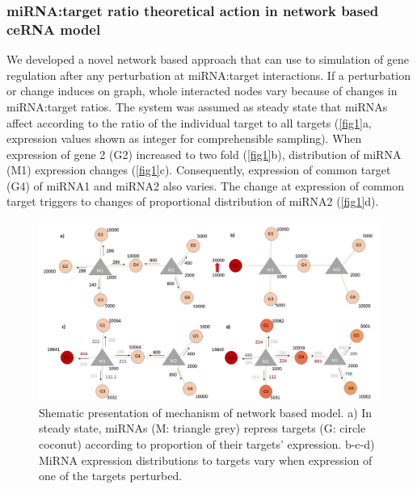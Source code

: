 \documentclass[]{article}
\begin{document}
\hypertarget{mirnatarget-ratio-theoretical-action-in-network-based-cerna-model}{%
\subsubsection{miRNA:target ratio theoretical action in network based
ceRNA
model}\label{mirnatarget-ratio-theoretical-action-in-network-based-cerna-model}}

We developed a novel network based approach that can use to simulation
of gene regulation after any perturbation at miRNA:target interactions.
If a perturbation or change induces on graph, whole interacted nodes
vary because of changes in miRNA:target ratios. The system was assumed
as steady state that miRNAs affect according to the ratio of the
individual target to all targets (\autoref{fig1}a, expression values
shown as integer for comprehensible sampling). When expression of gene 2
(G2) increased to two fold (\autoref{fig1}b), distribution of miRNA (M1)
expression changes (\autoref{fig1}c). Consequently, expression of common
target (G4) of miRNA1 and miRNA2 also varies. The change at expression
of common target triggers to changes of proportional distribution of
miRNA2 (\autoref{fig1}d).

\begin{figure}
\hypertarget{fig1}{%
\centering
\includegraphics{Fig1.jpg}
\caption{Shematic presentation of mechanism of network based model. a)
In steady state, miRNAs (M: triangle grey) repress targets (G: circle
coconut) according to proportion of their targets' expression. b-c-d)
MiRNA expression distributions to targets vary when expression of one of
the targets perturbed.}\label{fig1}
}
\end{figure}
\end{document}
